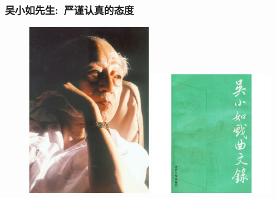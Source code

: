 \documentclass[cjk,slidestop,compress,mathserif,blue]{beamer}
\begin{document}
\frame
{
	\frametitle{吴小如先生:~严谨认真的态度}
\begin{figure}[h!]
\centering
\vspace{-0.2in}
\includegraphics[height=0.64\textwidth,width=0.46\textwidth,viewport=0 0 360 520,clip]{Figures_Peking-Opera/Wu_Xiaoru.jpg}
\hskip 5pt
\includegraphics[height=0.64\textwidth,width=0.46\textwidth,viewport=39 5 200 235,clip]{Figures_Peking-Opera/Wu_Wenlu.jpg}
\label{Wu_Xiaoru}
\end{figure}
}
\end{document}

